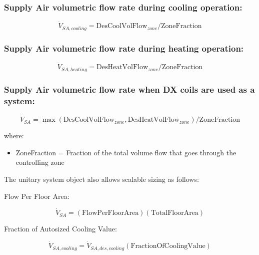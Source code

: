 \subsubsection{Supply Air volumetric flow rate during cooling operation:}\label{supply-air-volumetric-flow-rate-during-cooling-operation-1}

\begin{equation}
\dot V_{SA,cooling} = \text{DesCoolVolFlow}_{zone} / \text{ZoneFraction}
\end{equation}

\subsubsection{Supply Air volumetric flow rate during heating operation:}\label{supply-air-volumetric-flow-rate-during-heating-operation-1}

\begin{equation}
\dot V_{SA,heating} = \text{DesHeatVolFlow}_{zone} / \text{ZoneFraction}
\end{equation}

\subsubsection{Supply Air volumetric flow rate when DX coils are used as a system:}\label{supply-air-volumetric-flow-rate-when-dx-coils-are-used-as-a-system}

\begin{equation}
\dot V_{SA} = \max \left(\text{DesCoolVolFlow}_{zone}, \text{DesHeatVolFlow}_{zone}\right) / \text{ZoneFraction}
\end{equation}

where:

\begin{itemize}
\tightlist
\item
  ZoneFraction = Fraction of the total volume flow that goes through the controlling zone
\end{itemize}

The unitary system object also allows scalable sizing as follows:

Flow Per Floor Area:

\begin{equation}
\dot V_{SA} = \left(\text{FlowPerFloorArea}\right)\left(\text{TotalFloorArea}\right)
\end{equation}

Fraction of Autosized Cooling Value:

\begin{equation}
\dot V_{SA,cooling} = \dot V_{SA,des,cooling}\left(\text{FractionOfCoolingValue}\right)
\end{equation}

